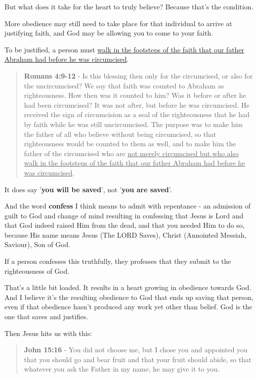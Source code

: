 \documentclass[11pt]{article}
\begin{document}
But what does it take for the heart to truly believe? Because that's the condition.

More obedience may still need to take place for that individual to arrive at justifying faith, and God may be allowing you to come to your faith.

To be justified, a person must \uline{walk in the footsteps of the faith that our father Abraham had before he was circumcised}.

\begin{quote}
\textbf{Romans 4:9-12} - Is this blessing then only for the circumcised, or also for the uncircumcised? We say that faith was counted to Abraham as righteousness. How then was it counted to him? Was it before or after he had been circumcised? It was not after, but before he was circumcised. He received the sign of circumcision as a seal of the righteousness that he had by faith while he was still uncircumcised. The purpose was to make him the father of all who believe without being circumcised, so that righteousness would be counted to them as well, and to make him the father of the circumcised who are \uline{not merely circumcised but who also walk in the footsteps of the faith that our father Abraham had before he was circumcised}.
\end{quote}

It does say '\textbf{you will be saved}', not '\textbf{you are saved}'.

And the word \textbf{confess} I think means to admit with repentance - an admission of guilt to God and change of mind resulting in confessing that Jesus is Lord and that God indeed raised Him from the dead, and that you needed Him to do so, because His name means Jesus (The LORD Saves), Christ (Annointed Messiah, Saviour), Son of God.

If a person confesses this truthfully, they professes that they submit to the righteousness of God.

That's a little bit loaded. It results in a heart growing in obedience towards God.
And I believe it's the resulting obedience to God that ends up saving that person, even if that obedience hasn't produced any work yet other than belief. God is the one that saves and justifies.

Then Jesus hits us with this:

\begin{quote}
\textbf{John 15:16} - You did not choose me, but I chose you and appointed you that you should go and bear fruit and that your fruit should abide, so that whatever you ask the Father in my name, he may give it to you.
\end{quote}
\end{document}
